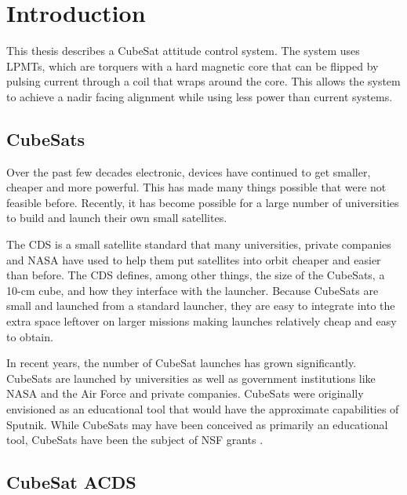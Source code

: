

\chapter{Introduction}

This thesis describes a CubeSat attitude control system. The system uses \acfp{LPMT}, which are torquers with a hard magnetic core that can be flipped by pulsing current through a coil that wraps around the core. This allows the system to achieve a nadir facing alignment while using less power than current systems. 

\section{CubeSats}

Over the past few decades electronic, devices have continued to get smaller, cheaper and more powerful. This has made many things possible that were not feasible before. Recently, it has become possible for a large number of universities to build and launch their own small satellites.

The \acf{CDS}\cite{CDS} is a small satellite standard that many universities, private companies and NASA have used to help them put satellites into orbit cheaper and easier than before. The \ac{CDS} defines, among other things, the size of the CubeSats, a 10-cm cube, and how they interface with the launcher. Because CubeSats are small and launched from a standard launcher, they are easy to integrate into the extra space leftover on larger missions making launches relatively cheap and easy to obtain.

In recent years, the number of CubeSat launches has grown significantly. CubeSats are launched by universities as well as government institutions like NASA and the Air Force  and private companies. CubeSats were originally envisioned as an educational tool that would have the approximate capabilities of Sputnik. While CubeSats may have been conceived as primarily an educational tool,  CubeSats have been the subject of NSF grants \cite{NSFcube}.

\section{CubeSat \acs{ACDS}}

